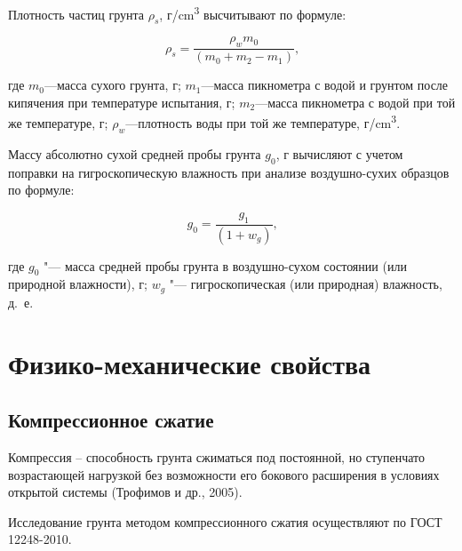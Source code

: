 Плотность частиц грунта $\rho_s$, г/\si{\centi\meter^3} высчитывают по формуле:

\[
   \rho_s = \frac{\rho_w m_0}{(m_0+m_2-m_1)} \text{,}
\]

где $m_0$---масса сухого грунта, г;
$m_1$---масса пикнометра с водой и грунтом после кипячения при
температуре испытания, г;
$m_2$---масса пикнометра с водой при той же температуре, г;
$\rho_w$---плотность воды при той же температуре, г/\si{\centi\meter^3}.

Массу абсолютно сухой средней пробы грунта $g_0$, г вычисляют с
учетом поправки на гигроскопическую влажность при анализе воздушно-сухих
образцов по формуле:

\[
   g_0 = \frac{g_1}{(1 + w_g)} \text{,}
\]

где $g_0$ "--- масса средней пробы грунта в воздушно-сухом состоянии (или
природной влажности), г;
$w_g$ "--- гигроскопическая (или природная) влажность, д.~е.

\section{Физико-механические свойства}\label{sec:ch6/sec2}

\subsection{Компрессионное сжатие}

Компрессия – способность грунта сжиматься под постоянной, 
но ступенчато возрастающей нагрузкой без возможности его 
бокового расширения в условиях открытой системы (Трофимов и др., 2005).

Исследование грунта методом компрессионного сжатия осуществляют по ГОСТ 12248-2010.


